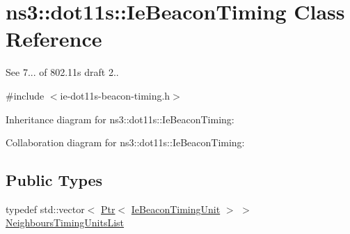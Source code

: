 \hypertarget{classns3_1_1dot11s_1_1IeBeaconTiming}{}\section{ns3\+:\+:dot11s\+:\+:Ie\+Beacon\+Timing Class Reference}
\label{classns3_1_1dot11s_1_1IeBeaconTiming}


See 7... of 802.\+11s draft 2..  




{\ttfamily \#include $<$ie-\/dot11s-\/beacon-\/timing.\+h$>$}



Inheritance diagram for ns3\+:\+:dot11s\+:\+:Ie\+Beacon\+Timing\+:


Collaboration diagram for ns3\+:\+:dot11s\+:\+:Ie\+Beacon\+Timing\+:
\subsection*{Public Types}
\begin{DoxyCompactItemize}
\item 
typedef std\+::vector$<$ \hyperlink{classns3_1_1Ptr}{Ptr}$<$ \hyperlink{classns3_1_1dot11s_1_1IeBeaconTimingUnit}{Ie\+Beacon\+Timing\+Unit} $>$ $>$ \hyperlink{group__dot11s_ga8dbec40aea7e1014f0af23de3b31a78c}{Neighbours\+Timing\+Units\+List}
\end{DoxyCompactItemize}
